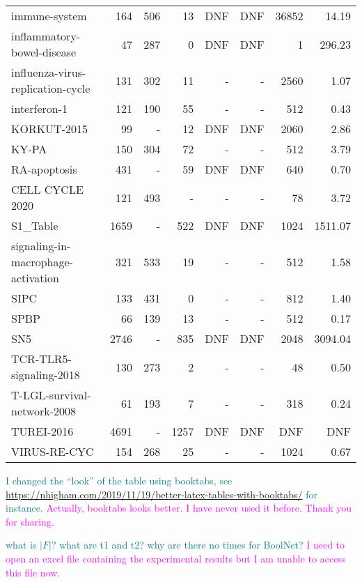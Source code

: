 \documentclass[runningheads]{llncs}
\newcommand{\vangiang}[1]{\textcolor{magenta}{#1}}
\newcommand{\sylvain}[1]{\textcolor{teal}{#1}}
\begin{document}
\begin{table}[!ht]
\begin{tabular}{lrrrrrrr}
    immune-system & 164 & 506 & 13 & DNF & DNF & 36852 & 14.19 \\
    inflammatory-bowel-disease~\cite{DBLP:journals/bmcsb/HelikarKMBRMWSLR12} & 47 & 287 & 0 & DNF & DNF & 1 & 296.23 \\
    influenza-virus-replication-cycle~\cite{DBLP:journals/bmcsb/HelikarKMBRMWSLR12} & 131 & 302 & 11 & - & - & 2560 & 1.07 \\
    interferon-1~\cite{ostaszewski2021covid19} & 121 & 190 & 55 & - & - & 512 & 0.43 \\
    KORKUT-2015 & 99 & - & 12 & DNF & DNF & 2060 & 2.86 \\
    KY-PA & 150 & 304 & 72 & - & - & 512 & 3.79 \\
    RA-apoptosis~\cite{aghamiri2020automated} & 431 & - & 59 & DNF & DNF & 640 & 0.70 \\
    CELL CYCLE 2020 & 121 & 493 & - & - & - & 78 & 3.72 \\
    S1\_Table & 1659 & - & 522 & DNF & DNF & 1024 & 1511.07 \\
    signaling-in-macrophage-activation~\cite{DBLP:journals/bmcsb/HelikarKMBRMWSLR12} & 321 & 533 & 19 & - & - & 512 & 1.58 \\
    SIPC~\cite{Montagud2021} & 133 & 431 & 0 & - & - & 812 & 1.40 \\
    SPBP & 66 & 139 & 13 & - & - & 512 & 0.17 \\
    SN5~\cite{kim2013rmod} & 2746 & - & 835 & DNF & DNF & 2048 & 3094.04 \\
    TCR-TLR5-signaling-2018 & 130 & 273 & 2 & - & - & 48 & 0.50 \\
    T-LGL-survival-network-2008~\cite{DBLP:journals/bmcsb/HelikarKMBRMWSLR12} & 61 & 193 & 7 & - & - & 318 & 0.24 \\
    TUREI-2016 & 4691 & - & 1257 & DNF & DNF & DNF & DNF \\
    VIRUS-RE-CYC & 154 & 268 & 25 & - & - & 1024 & 0.67 \\ \bottomrule
  \end{tabular}

\sylvain{I changed the ``look'' of the table using booktabs, see \url{https://nhigham.com/2019/11/19/better-latex-tables-with-booktabs/} for instance.}
\vangiang{Actually, booktabs looks better. I have never used it before. Thank you for sharing.}

\sylvain{what is $|F|$? what are t1 and t2? why are there no times for BoolNet?}
\vangiang{I need to open an excel file containing the experimental results but I am unable to access this file now.}

\end{table}
\end{document}

